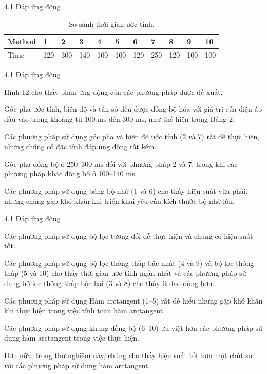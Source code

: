 \documentclass[11pt]{beamer}
\renewcommand{\label}[1]{%
			\gdef\sfname{sf:##1}}%
\begin{document}
\begin{frame}[t]{4.1 Đáp ứng động}
	\justifying
	\begin{table}
		\begin{tabular}{lllllllllll}
			\toprule
			Method & 1 	& 2		&3&4&5&6&7&8&9&10   \\
			\midrule
			Time   & 120 	& 300  &140&100&100&120&250&120&100&100\\
			\bottomrule
		\end{tabular}
		\caption{\label{tab:table-1}So sánh thời gian ước tính.}
	\end{table}
	
\end{frame}

\begin{frame}[t]{4.1 Đáp ứng động}
	
	Hình 12 cho thấy phản ứng động của các phương pháp được đề xuất. 
	
	Góc pha ước tính, biên độ và tần số đều được đồng bộ hóa với giá trị của điện áp đầu vào trong khoảng từ 100 ms đến 300 ms, như thể hiện trong Bảng 2.
	
	Các phương pháp sử dụng góc pha và biên độ ước tính (2 và 7) rất dễ thực hiện, nhưng chúng có đặc tính đáp ứng động rất kém. 
	
	Góc pha đồng bộ ở 250–300 ms đối với phương pháp 2 và 7, trong khi các phương pháp khác đồng bộ ở 100–140 ms. 
	
	Các phương pháp sử dụng bảng bộ nhớ (1 và 6) cho thấy hiệu suất vừa phải, nhưng chúng gặp khó khăn khi triển khai yêu cầu kích thước bộ nhớ lớn. 
	
	
\end{frame}	

\begin{frame}[t]{4.1 Đáp ứng động}
	
	Các phương pháp sử dụng bộ lọc tương đối dễ thực hiện và chúng có hiệu suất tốt. 
	
	Các phương pháp sử dụng bộ lọc thông thấp bậc nhất (4 và 9) và bộ lọc thông thấp (5 và 10) cho thấy thời gian ước tính ngắn nhất và các phương pháp sử dụng bộ lọc thông thấp bậc hai (3 và 8) cho thấy ít dao động hơn. 
	
	Các phương pháp sử dụng Hàm arctangent (1–5) rất dễ hiểu nhưng gặp khó khăn khi thực hiện trong việc tính toán hàm arctangent. 
	
	Các phương pháp sử dụng khung đồng bộ (6–10) ưu việt hơn các phương pháp sử dụng hàm arctangent trong việc thực hiện. 
	
	Hơn nữa, trong thử nghiệm này, chúng cho thấy hiệu suất tốt hơn một chút so với các phương pháp sử dụng hàm arctangent. 
	
	
\end{frame}
\end{document}
